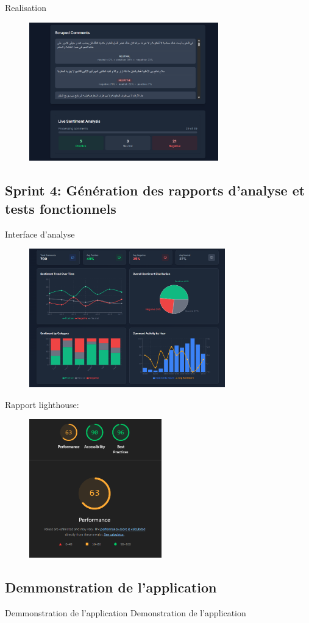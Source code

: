 \begin{frame}{Realisation}
    \begin{figure}[H]
        \centering
        \includegraphics[height=6cm]{assets/images/report-ui.png}
    \end{figure}
\end{frame}




\subsection{Sprint 4: Génération des rapports d'analyse et tests fonctionnels}

\begin{frame}{Interface d'analyse }
    \begin{figure}[H]
        \centering
        \includegraphics[height=6cm]{assets/images/admin-ui.png}
    \end{figure}
\end{frame}

\begin{frame}{Rapport lighthouse:}
    \begin{figure}[H]
        \centering
        \includegraphics[height=6cm]{assets/images/lighthouse.png}
    \end{figure}
\end{frame}

\subsection{Demmonstration de l'application}
\begin{frame}{Demmonstration de l'application}
    Demonstration de l'application
\end{frame}
